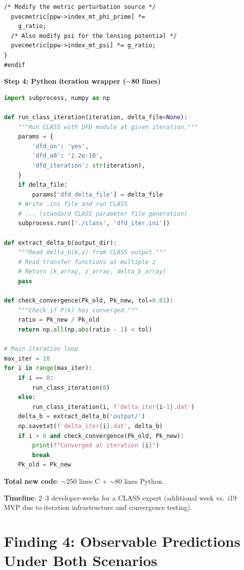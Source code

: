 \documentclass[11pt]{article}
\theoremstyle{definition}
\theoremstyle{remark}
\begin{document}
\begin{tcolorbox}[colback=green!5!white, colframe=green!60!black,
  title=\textbf{NONLINEAR DFD CLASS: Complete Coding Specification}]
\begin{lstlisting}[numbers=none]
  /* Modify the metric perturbation source */
  pvecmetric[ppw->index_mt_phi_prime] *=
    g_ratio;
  /* Also modify psi for the lensing potential */
  pvecmetric[ppw->index_mt_psi] *= g_ratio;
}
#endif
\end{lstlisting}

\textbf{Step 4: Python iteration wrapper ($\sim$80 lines)}

\begin{lstlisting}[language=Python,numbers=none,
  caption={iterate\_dfd.py --- convergence loop}]
import subprocess, numpy as np

def run_class_iteration(iteration, delta_file=None):
    """Run CLASS with DFD module at given iteration."""
    params = {
        'dfd_on': 'yes',
        'dfd_a0': '1.2e-10',
        'dfd_iteration': str(iteration),
    }
    if delta_file:
        params['dfd_delta_file'] = delta_file
    # Write .ini file and run CLASS
    # ... (standard CLASS parameter file generation)
    subprocess.run(['./class', 'dfd_iter.ini'])

def extract_delta_b(output_dir):
    """Read delta_b(k,z) from CLASS output."""
    # Read transfer functions at multiple z
    # Return (k_array, z_array, delta_b_array)
    pass

def check_convergence(Pk_old, Pk_new, tol=0.01):
    """Check if P(k) has converged."""
    ratio = Pk_new / Pk_old
    return np.all(np.abs(ratio - 1) < tol)

# Main iteration loop
max_iter = 10
for i in range(max_iter):
    if i == 0:
        run_class_iteration(0)
    else:
        run_class_iteration(i, f'delta_iter{i-1}.dat')
    delta_b = extract_delta_b('output/')
    np.savetxt(f'delta_iter{i}.dat', delta_b)
    if i > 0 and check_convergence(Pk_old, Pk_new):
        print(f"Converged at iteration {i}")
        break
    Pk_old = Pk_new
\end{lstlisting}

\textbf{Total new code}: $\sim$250 lines C + $\sim$80 lines Python.

\textbf{Timeline}: 2--3 developer-weeks for a CLASS expert (additional
week vs.\ i19 MVP due to iteration infrastructure and convergence
testing).
\end{tcolorbox}


\section{Finding 4: Observable Predictions Under Both Scenarios}
\label{sec:predictions}
\end{document}
